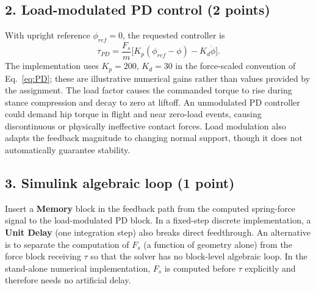 \subsection*{2. Load-modulated PD control (2 points)}
With upright reference $\phi_{ref}=0$, the requested controller is
\begin{equation}
\boxed{\quad\tau_{PD}=\frac{F_s}{m}\bigl[K_p(\phi_{ref}-\phi)-K_d\dot\phi\bigr].\quad}
\label{eq:PD}
\end{equation}
The implementation uses $K_p=200$, $K_d=30$ in the force-scaled convention of Eq.~\eqref{eq:PD}; these are illustrative numerical gains rather than values provided by the assignment. The load factor causes the commanded torque to rise during stance compression and decay to zero at liftoff. An unmodulated PD controller could demand hip torque in flight and near zero-load events, causing discontinuous or physically ineffective contact forces. Load modulation also adapts the feedback magnitude to changing normal support, though it does not automatically guarantee stability.

\subsection*{3. Simulink algebraic loop (1 point)}
Insert a \textbf{Memory} block in the feedback path from the computed spring-force signal to the load-modulated PD block. In a fixed-step discrete implementation, a \textbf{Unit Delay} (one integration step) also breaks direct feedthrough. An alternative is to separate the computation of $F_s$ (a function of geometry alone) from the force block receiving $\tau$ so that the solver has no block-level algebraic loop. In the stand-alone numerical implementation, $F_s$ is computed before $\tau$ explicitly and therefore needs no artificial delay.

